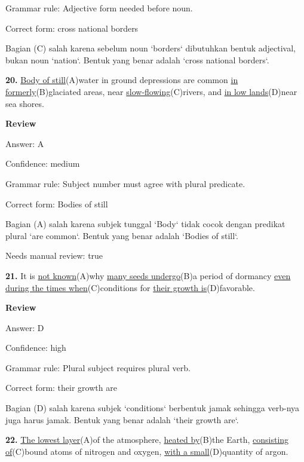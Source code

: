 \documentclass[12pt]{article}
\begin{document}
Grammar rule: Adjective form needed before noun.\par
Correct form: cross national borders\par
Bagian (C) salah karena sebelum noun `borders` dibutuhkan bentuk adjectival, bukan noun `nation`. Bentuk yang benar adalah `cross national borders`.\par
\endgroup
\par
\vspace{\questionblockgap}
\noindent\textbf{20.} \uline{Body of still}(A)water in ground depressions are common \uline{in formerly}(B)glaciated areas, near \uline{slow-flowing}(C)rivers, and \uline{in low lands}(D)near sea shores.
\par
\begingroup
\setlength{\parskip}{0pt}
\setlength{\parindent}{0pt}
\textbf{Review}\par
Answer: A\par
Confidence: medium\par
Grammar rule: Subject number must agree with plural predicate.\par
Correct form: Bodies of still\par
Bagian (A) salah karena subjek tunggal `Body` tidak cocok dengan predikat plural `are common`. Bentuk yang benar adalah `Bodies of still`.\par
Needs manual review: true\par
\endgroup
\par
\vspace{\questionblockgap}
\noindent\textbf{21.} It is \uline{not known}(A)why \uline{many seeds undergo}(B)a period of dormancy \uline{even during the times when}(C)conditions for \uline{their growth is}(D)favorable.
\par
\begingroup
\setlength{\parskip}{0pt}
\setlength{\parindent}{0pt}
\textbf{Review}\par
Answer: D\par
Confidence: high\par
Grammar rule: Plural subject requires plural verb.\par
Correct form: their growth are\par
Bagian (D) salah karena subjek `conditions` berbentuk jamak sehingga verb-nya juga harus jamak. Bentuk yang benar adalah `their growth are`.\par
\endgroup
\par
\vspace{\questionblockgap}
\noindent\textbf{22.} \uline{The lowest layer}(A)of the atmosphere, \uline{heated by}(B)the Earth, \uline{consisting of}(C)bound atoms of nitrogen and oxygen, \uline{with a small}(D)quantity of argon.
\end{document}

